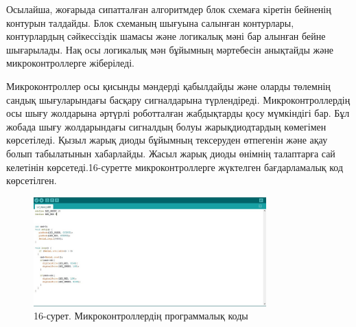 \begin{multicols}{2}
Осылайша, жоғарыда сипатталған алгоритмдер блок схемаға кіретін бейненің
контурын талдайды. Блок схеманың шығуына салынған контурлары,
контурлардың сәйкессіздік шамасы және логикалық мәні бар алынған бейне
шығарылады. Нақ осы логикалық мән бұйымның мәртебесін анықтайды және
микроконтроллерге жіберіледі.

Микроконтроллер осы қисынды мәндерді қабылдайды және оларды төлемнің
сандық шығуларындағы басқару сигналдарына түрлендіреді.
Микроконтроллердің осы шығу жолдарына әртүрлі роботталған жабдықтарды
қосу мүмкіндігі бар. Бұл жобада шығу жолдарындағы сигналдың болуы
жарықдиодтардың көмегімен көрсетіледі. Қызыл жарық диоды бұйымның
тексеруден өтпегенін және ақау болып табылатынын хабарлайды. Жасыл жарық
диоды өнімнің талаптарға сай келетінін көрсетеді.16-суретте
микроконтроллерге жүктелген бағдарламалық код көрсетілген.
\end{multicols}

\begin{figure}[H]
	\centering
	\includegraphics[width=0.8\textwidth]{media/ict2/image186}
	\caption*{16-сурет. Микроконтроллердің программалық коды}
\end{figure}

